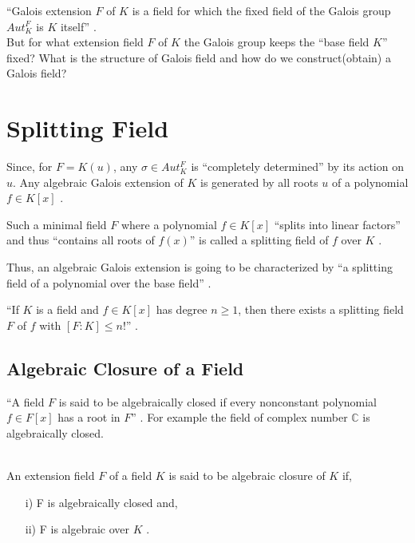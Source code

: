 ``Galois extension \(F\) of  \(K\) is a field for which the fixed field of the Galois group \(Aut_K^F\) is \(K\) itself'' \cite{hunger}.\\
But for what extension field \(F\) of \(K\) the Galois group keeps the ``base field \(K\)'' fixed? What is the structure of Galois field and how do we construct(obtain) a Galois field?


\section{Splitting Field}
Since, for \(F=K(u)\), any \(\sigma \in Aut_K^F\) is ``completely determined'' \cite{hunger} by its action on \(u\). Any algebraic Galois extension of \(K\) is generated by all roots \(u\) of a polynomial \(f \in K[x]\) \cite{hunger}.

\begin{definition}
  Such a minimal field \(F\) where a polynomial \(f \in K[x]\) ``splits into linear factors'' and thus ``contains all roots of \(f(x)\)'' is called a splitting field of \(f\) over \(K\) \cite{hunger}.
\end{definition}
Thus, an algebraic Galois extension is going to be characterized by ``a splitting field of a polynomial over the base field'' \cite{hunger}.\\

\begin{theorem}
  ``If \(K\) is a field and \(f \in K[x]\) has degree \(n \geq 1\), then there exists a splitting field \(F\) of \(f\) with \([F:K] \leq n!\)'' \cite{hunger}.
  \end{theorem}

\subsection{Algebraic Closure of a Field}
``A field \(F\) is said to be algebraically closed if every nonconstant polynomial \(f \in F[x]\) has a root in \(F\)'' \cite{hunger}.
For example the field of complex number \(\mathbb{C}\) is algebraically closed.\\ \\

\begin{definition}
An extension field \(F\) of a field \(K\) is said to be algebraic closure of \(K\) if,
\begin{enumerate}
\item[i)] F is algebraically closed and,
  \item[ii)] F is algebraic over \(K\) \cite{hunger}.
  \end{enumerate}
\end{definition}


